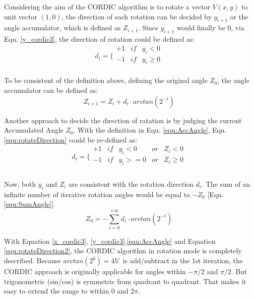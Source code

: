Considering the aim of the CORDIC algorithm is to rotate a vector $V(x,y)$ to unit vector $(1,0)$, the direction of each rotation can be decided by $y_{i+1}$ or the angle accumulator, which is defined as $Z_{i+1}$. Since $y_{i+1}$ would finally be $0$, via Equ. \eqref{y_cordic3}, the direction of rotation could be defined as:
\begin{equation}
d_{i} = \Bigg\{ 
\begin{array}{ccc}
+1 & if &  y_i <  0      	\\
-1 & if &  y_i \ge 0       \\
\end{array}
\label{equ:rotateDirection}
\end{equation}

To be consistent of the definition above, defining the original angle $Z_0$, the angle accumulator can be defined as:
\begin{equation}
Z_{i+1}=  Z_{i} + d_i \cdot arctan(2^{-i})	
\label{equ:AccAngle}
\end{equation}

Another approach to decide the direction of ratation is by judging the current Accumulated Angle $Z_0$. With the definition in Equ. \eqref{equ:AccAngle}, Eqn. \eqref{equ:rotateDirection} could be re-defined as:
\begin{equation}
d_{i} = \Bigg\{ 
\begin{array}{ccccc}
+1 & if &  y_i <  0 & or & Z_i < 0    	\\
-1 & if &  y_i >= 0 & or & Z_i \ge 0   \\
\end{array}
\label{equ:rotateDirection2}
\end{equation}
\\ %
Now, both $y_i$ and $Z_i$ are consistent with the rotation direction $d_i$. The sum of an infinite number of iterative rotation angles would be equal to $-Z_0$ [Equ. \eqref{equ:SumAngle}].
\begin{equation}
Z_{0}= - \sum_{i=0}^{+\infty} d_i \cdot arctan(2^{-i})
\label{equ:SumAngle}
\end{equation}

With Equation \eqref{x_cordic3}, \eqref{y_cordic3},\eqref{equ:AccAngle} and Equation \eqref{equ:rotateDirection2}, the CORDIC algorithm in rotation mode is completely described. Because $arctan(2^0 )=45^{\circ}$  is add/subtract in the 1st iteration, the CORDIC approach is originally applicable for angles within $-\pi /2$ and  $\pi /2$. But trigonometric (sin/cos) is symmetric from quadrant to quadrant. That makes it easy to extend the range to within $0$ and $2\pi$.

